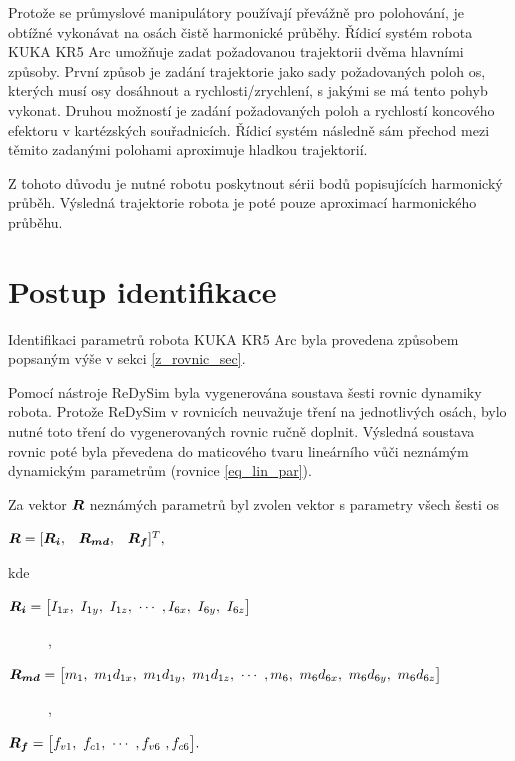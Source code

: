 Protože se průmyslové manipulátory používají převážně pro polohování, je obtížné vykonávat na osách čistě harmonické průběhy. Řídicí systém robota KUKA KR5 Arc umožňuje zadat požadovanou trajektorii dvěma hlavními způsoby. První způsob je zadání trajektorie jako sady požadovaných poloh os, kterých musí osy dosáhnout a rychlosti/zrychlení, s jakými se má tento pohyb vykonat. Druhou možností je zadání požadovaných poloh a rychlostí koncového efektoru v kartézských souřadnicích. Řídicí systém následně sám přechod mezi těmito zadanými polohami aproximuje hladkou trajektorií. 

Z tohoto důvodu je nutné robotu poskytnout sérii bodů popisujících harmonický průběh. Výsledná trajektorie robota je poté pouze aproximací harmonického průběhu.  

\section{Postup identifikace}

Identifikaci parametrů robota KUKA KR5 Arc byla provedena způsobem popsaným výše v sekci \ref{z_rovnic_sec}. 

Pomocí nástroje ReDySim byla vygenerována soustava šesti rovnic dynamiky robota. Protože ReDySim v rovnicích neuvažuje tření na jednotlivých osách, bylo nutné toto tření do vygenerovaných rovnic ručně doplnit. Výsledná soustava rovnic poté byla převedena do maticového tvaru lineárního vůči neznámým dynamickým parametrům (rovnice \eqref{eq_lin_par}). 

\newpage
Za vektor $\boldsymbol{R}$ neznámých parametrů byl zvolen vektor s parametry všech šesti os

$\boldsymbol{R} = [\begin{matrix} \boldsymbol{R_i}, & \boldsymbol{R_{md}}, & \boldsymbol{R_f} \end{matrix}]^{T},$

kde 
\begin{description}
\item[$  \vect{R_i} = {\big[I_{1x}, \ I_{1y}, \ I_{1z}, \ \cdots \ , I_{6x}, \ I_{6y}, \ I_{6z}\big]}$], 
\item[$\vect{R_{md}} = {\big[m_1, \ m_1d_{1x}, \ m_1d_{1y}, \ m_1d_{1z}, \ \cdots \ , m_6, \ m_6d_{6x}, \ m_6d_{6y}, \ m_6d_{6z}\big]}$], 
\item[$\vect{R_f} = {\big[f_{v1}, \ f_{c1}, \ \cdots \ ,f_{v6} \ , f_{c6}\big]}.$] 
\end{description}

